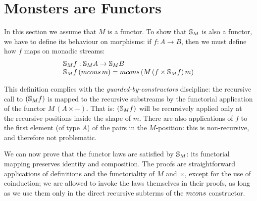 \section{Monsters are Functors}\label{sec:functor}

In this section we assume that $M$ is a functor.
To show that $\mathbb{S}_{M}$ is also a functor, we have to define its behaviour on morphisms: if $f:A\rightarrow B$, then we must define how $f$ maps on monadic streams:
$$
\begin{array}{l}
\stream{M} f : \stream{M} A \rightarrow \stream{M} B\\
\stream{M} f\,(\mcons\,m) = \mcons\,(M\,(f\times \stream{M} f)\,m)
\end{array}
$$

This definition complies with the {\em guarded-by-constructors} discipline: the recursive call to $(\mathbb{S}_{M} f)$ is mapped to the recursive substreams by the functorial application of the functor $M\,(A \times -)$.
That is: $(\mathbb{S}_{M} f)$ will be recursively applied only at the recursive positions inside the shape of $m$.
There are also applications of $f$ to the first element (of type $A$) of the pairs in the $M$-position: this is non-recursive, and therefore not problematic.


We can now prove that the functor laws are satisfied by $\mathbb{S}_{M}$: its functorial mapping preserves identity and composition.
The proofs are straightforward applications of definitions and the functoriality of $M$ and $\times$, except for the use of coinduction;
we are allowed to invoke the laws themselves in their proofs, as long as we use them only in the direct recursive subterms of the $\mcons$ constructor.


